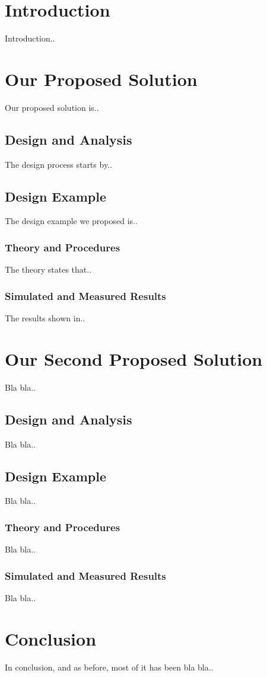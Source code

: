 \section{Introduction}

Introduction..

\section{Our Proposed Solution}\label{Ch3:ProposedSol}

Our proposed solution is..

\subsection{Design and Analysis}\label{Ch3:Analysis}

The design process starts by..

\subsection{Design Example} \label{Ch3:Example}

The design example we proposed is.. 

\subsubsection{Theory and Procedures}\label{Ch3:Theory}

The theory states that..

\subsubsection{Simulated and Measured Results}\label{Ch3:Measured}

The results shown in..

\section{Our Second Proposed Solution}

Bla bla..

\subsection{Design and Analysis}

Bla bla..

\subsection{Design Example}

Bla bla..

\subsubsection{Theory and Procedures}

Bla bla..

\subsubsection{Simulated and Measured Results}

Bla bla..

\section{Conclusion}

In conclusion, and as before, most of it has been bla bla..